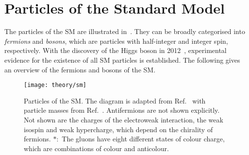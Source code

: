 \section{Particles of the Standard Model}%
\label{sec:sm_overview}

The particles of the SM are illustrated in~. They can be
broadly categorised into \emph{fermions} and \emph{bosons}, which are particles
with half-integer and integer spin, respectively. With the discovery of the
Higgs boson in 2012~\cite{HIGG-2012-27,CMS-HIG-12-028}, experimental evidence
for the existence of all SM particles is established. The following gives an
overview of the fermions and bosons of the SM.


\begin{figure}[htbp]
  \centering

  \texttt{[image: theory/sm]}

  \caption[Particles of the SM.]{Particles of the SM. The diagram is adapted
    from Ref.~\cite{sm_tikz} with particle masses from
    Ref.~\cite{pdg2020}. Antifermions are not shown explicitly.  Not shown are
    the charges of the electroweak interaction, the weak isospin and weak
    hypercharge, which depend on the chirality of fermions. $*$:~The gluons have
    eight different states of colour charge, which are combinations of colour
    and anticolour.}%
  \label{fig:sm_particles}
\end{figure}

